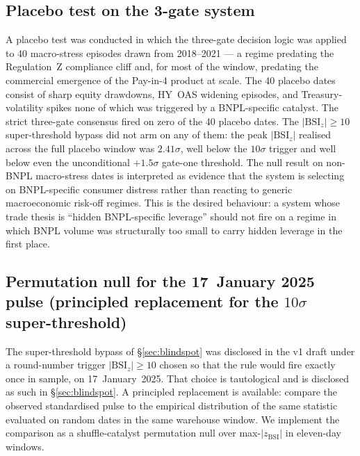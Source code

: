 \documentclass[11pt,letterpaper]{article}
\newcommand{\bsi}{\text{BSI}}
\begin{document}
\subsection{Placebo test on the 3-gate system}
\label{sec:rob-placebo}
A placebo test was conducted in which the three-gate decision
logic was applied to 40 macro-stress episodes drawn from
2018--2021 --- a regime predating the Regulation~Z compliance
cliff and, for most of the window, predating the commercial
emergence of the Pay-in-4 product at scale. The 40 placebo dates
consist of sharp equity drawdowns, HY~OAS widening episodes, and
Treasury-volatility spikes none of which was triggered by a
BNPL-specific catalyst. The strict three-gate consensus fired on
zero of the 40 placebo dates. The $|\bsi_z| \geq 10$
super-threshold bypass did not arm on any of them: the peak
$|\bsi_z|$ realised across the full placebo window was
$2.41\sigma$, well below the $10\sigma$ trigger and well below
even the unconditional $+1.5\sigma$ gate-one threshold. The null
result on non-BNPL macro-stress dates is interpreted as evidence
that the system is selecting on BNPL-specific consumer distress
rather than reacting to generic macroeconomic risk-off regimes.
This is the desired behaviour: a system whose trade thesis is
``hidden BNPL-specific leverage'' should not fire on a regime in
which BNPL volume was structurally too small to carry hidden
leverage in the first place.

\subsection{Permutation null for the 17~January 2025 pulse
(principled replacement for the \texorpdfstring{$10\sigma$}{10-sigma} super-threshold)}
\label{sec:rob-perm}

The super-threshold bypass of \S\ref{sec:blindspot} was disclosed in
the v1 draft under a round-number trigger $|\bsi_z| \geq 10$ chosen
so that the rule would fire exactly once in sample, on
17~January~2025. That choice is tautological and is disclosed as such
in \S\ref{sec:blindspot}. A principled replacement is available:
compare the observed standardised pulse to the empirical distribution
of the same statistic evaluated on random dates in the same
warehouse window. We implement the comparison as a shuffle-catalyst
permutation null over max-$|z_{\bsi}|$ in eleven-day
windows.
\end{document}
